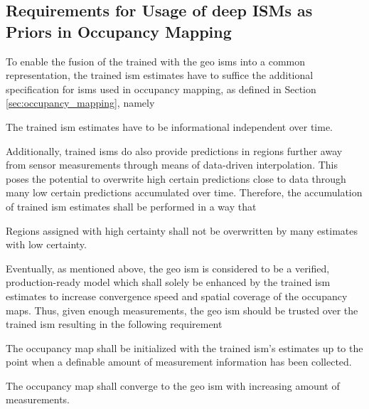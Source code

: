 \subsection{Requirements for Usage of deep ISMs as Priors in Occupancy Mapping}
\label{subsec:requirements_for_usage_of_deep_ims_as_priors_in_occmapping}
To enable the fusion of the trained with the geo \gls{ism}s into a common representation, the trained \gls{ism} estimates have to suffice the additional specification for \gls{ism}s used in occupancy mapping, as defined in Section \ref{sec:occupancy_mapping}, namely
\\
\setcounter{req}{2}
\setcounter{subreq}{0}
\begin{subreq} \label{subreq:indep_info}
	The trained \gls{ism} estimates have to be informational independent over time.
\end{subreq}
Additionally, trained \gls{ism}s do also provide predictions in regions further away from sensor measurements through means of data-driven interpolation. This poses the potential to overwrite high certain predictions close to data through many low certain predictions accumulated over time. Therefore, the accumulation of trained \gls{ism} estimates shall be performed in a way that
\\
\begin{subreq} \label{subreq:no_falsification}
	Regions assigned with high certainty shall not be overwritten by many estimates with low certainty. 
\end{subreq}
Eventually, as mentioned above, the geo \gls{ism} is considered to be a verified, production-ready model which shall solely be enhanced by the trained \gls{ism} estimates to increase convergence speed and spatial coverage of the occupancy maps. Thus, given enough measurements, the geo \gls{ism} should be trusted over the trained \gls{ism} resulting in the following requirement
\\
\begin{subreq} \label{subreq:initialize_with_deep_ism}
	The occupancy map shall be initialized with the trained \gls{ism}'s estimates up to the point when a definable amount of measurement information has been collected.
\end{subreq}
\vspace{\baselineskip}
\begin{subreq} \label{subreq:converge_to_geo_ism}
	The occupancy map shall converge to the geo \gls{ism} with increasing amount of measurements.
\end{subreq}
%
